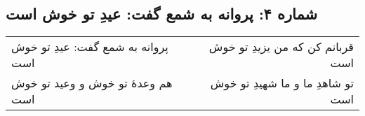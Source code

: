\begin{center}
\section*{شماره ۴: پروانه به شمع گفت: عیدِ تو خوش است}
\label{sec:004}
\begin{longtable}{l p{0.5cm} r}
پروانه به شمع گفت: عیدِ تو خوش است
&&
قربانم کن که من یزیدِ تو خوش است
\\
هم وعدهٔ تو خوش و وعید تو خوش است
&&
تو شاهدِ ما و ما شهیدِ تو خوش است
\\
\end{longtable}
\end{center}
